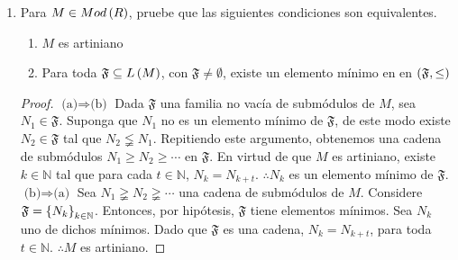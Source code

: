 \documentclass{article}
\begin{document}
\begin{enumerate}[label=\textbf{Ej \arabic*.}]
\begin{proof}
			\begin{align*}
				\genmod{j_1,\dotsc,j_k}{R}\leq J_t\lneq J =\genmod{j_1,\dotsc,j_k}{R},
			\end{align*}
			lo cual es absurdo ($J_t$ es un submódulo estricto de $J$ pues $\arbtfam{J}{n}{\mathbb{N}}$ es una cadena estrictamente ascendente) y por lo tanto $J$ no es finitamente generado.\\
			 Sea $\arbtfam{A}{n}{\mathbb{N}}$ una cadena ascendente de submódulos. Luego $\varnothing\neq\arbtfam{A}{n}{\mathbb{N}}\subseteq\genlin{M}$ y por lo tanto $\lrprth{\arbtfam{A}{n}{\mathbb{N}},\leq}$ posee al menos un elemento maximal. De modo que $\exists\ k\in\mathbb{N}$ tal que $A_k$ es maximal en $\lrprth{\arbtfam{A}{n}{\mathbb{N}},\leq}$. Si $\forall\ l>k$ $A_l=A_k$ se tiene lo deseado. Supongamos que $\exists\ l>k$ tal que $A_k\lneq A_l$, por ser maximal, se tiene que $A_l=M$ y por lo tanto $A_r=M$, $\forall\ r\geq l$. Así, en cualquier caso, se tiene que la cadena se estabiliza y por lo tanto $M$ es noetheriano.\\
		\end{proof}
		\item %
		Para $M \in Mod\left(R\right)$, pruebe que las siguientes condiciones son equivalentes.
		\begin{enumerate}
			\item $M$ es artiniano
			\item Para toda $\mathfrak{F}\subseteq L\left(M\right)$, con $\mathfrak{F}\neq\emptyset$, existe un elemento mínimo en en $\left(\mathfrak{F},\leq\right)$
		\end{enumerate}
		\begin{proof}
			$\boxed{\text{(a)}\Rightarrow\text{(b)}}$ Dada $\mathfrak{F}$ una familia no vacía de submódulos de $M$, sea $N_{1}\in\mathfrak{F}$. Suponga que $N_{1}$ no es un elemento mínimo de $\mathfrak{F}$, de este modo existe $N_{2}\in\mathfrak{F}$ tal que $N_{2} \lneqq N_{1}$. Repitiendo este argumento, obtenemos una cadena de submódulos $N_{1} \geq N_{2} \geq \cdots$ en $\mathfrak{F}$. En virtud de que $M$ es artiniano, existe $k\in\mathbb{N}$ tal que para cada $t\in\mathbb{N}$, $N_{k}=N_{k+t}$. $\therefore N_{k}$ es un elemento mínimo de $\mathfrak{F}$.\\
			
			$\boxed{\text{(b)}\Rightarrow\text{(a)}}$ Sea $N_{1} \gneqq N_{2} \gneqq \cdots$ una cadena de submódulos de $M$. Considere $\mathfrak{F}={\left\{{N}_{k}\right\}}_{k\in \mathbb{N}}$. Entonces, por hipótesis, $\mathfrak{F}$ tiene elementos mínimos. Sea $N_{k}$ uno de dichos mínimos. Dado que $\mathfrak{F}$ es una cadena, $N_{k}=N_{k+t}$, para toda $t\in\mathbb{N}$. $\therefore M$ es artiniano.
		\end{proof}
		

\end{enumerate}
\end{document}
